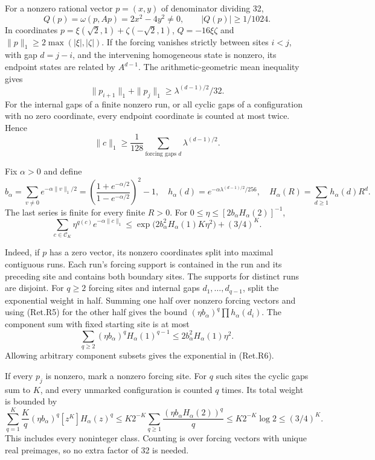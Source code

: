 For a nonzero rational vector \(p=(x,y)\) of denominator dividing 32,
\[
 Q(p)=\omega(p,Ap)=2x^2-4y^2\ne0,\qquad |Q(p)|\ge1/1024.
\]
In coordinates \(p=\xi(\sqrt2,1)+\zeta(-\sqrt2,1)\),
\(Q=-16\xi\zeta\) and \(\|p\|_1\ge2\max(|\xi|,|\zeta|)\).
If the forcing vanishes strictly between sites \(i<j\), with gap \(d=j-i\),
and the intervening homogeneous state is nonzero, its endpoint states
are related by \(A^{d-1}\). The arithmetic-geometric mean inequality gives
\[
 \|p_{i+1}\|_1+\|p_j\|_1
                         \ge \lambda^{(d-1)/2}/32.
\]
For the internal gaps of a finite nonzero run, or all cyclic gaps of
a configuration with no zero coordinate, every endpoint coordinate
is counted at most twice. Hence
\[
 \|c\|_1\ge\frac1{128}\sum_{\text{forcing gaps }d}
                                   \lambda^{(d-1)/2}.      \tag{Ret.R5}
\]

Fix \(\alpha>0\) and define
\[
 b_\alpha=\sum_{v\ne0}e^{-\alpha\|v\|_1/2}
       =\left(\frac{1+e^{-\alpha/2}}{1-e^{-\alpha/2}}\right)^2-1,
 \quad h_\alpha(d)=e^{-\alpha\lambda^{(d-1)/2}/256},
 \quad H_\alpha(R)=\sum_{d\ge1}h_\alpha(d)R^d .
\]
The last series is finite for every finite \(R>0\).
For
\(0\le\eta\le[2b_\alpha H_\alpha(2)]^{-1}\),
\[
 \sum_{c\in\mathcal C_K}\eta^{q(c)}e^{-\alpha\|c\|_1}
 \le \exp\bigl(2b_\alpha^2H_\alpha(1)K\eta^2\bigr)
                                              +(3/4)^K.   \tag{Ret.R6}
\]

Indeed, if \(p\) has a zero vector, its nonzero coordinates split into
maximal contiguous runs. Each run's forcing support is contained in the
run and its preceding site and contains both boundary sites.
The supports for distinct runs are disjoint.
For \(q\ge2\) forcing sites and internal gaps \(d_1,\ldots,d_{q-1}\),
split the exponential weight in half. Summing one half over nonzero
forcing vectors and using (Ret.R5) for the other half gives the bound
\((\eta b_\alpha)^q\prod h_\alpha(d_i)\).
The component sum with fixed starting site is at most
\[
 \sum_{q\ge2}(\eta b_\alpha)^qH_\alpha(1)^{q-1}
                       \le2b_\alpha^2H_\alpha(1)\eta^2.
\]
Allowing arbitrary component subsets gives the exponential in (Ret.R6).

If every \(p_j\) is nonzero, mark a nonzero forcing site. For \(q\) such sites
the cyclic gaps sum to \(K\), and every unmarked configuration is counted
\(q\) times. Its total weight is bounded by
\[
 \sum_{q=1}^K\frac Kq(\eta b_\alpha)^q[z^K]H_\alpha(z)^q
 \le K2^{-K}\sum_{q\ge1}
                  \frac{(\eta b_\alpha H_\alpha(2))^q}{q}
 \le K2^{-K}\log2\le(3/4)^K .
\]
This includes every noninteger class. Counting is over forcing vectors
with unique real preimages, so no extra factor of 32 is needed.

